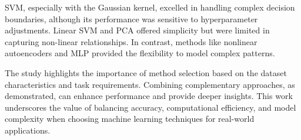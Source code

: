 \documentclass{article}
\begin{document}
SVM, especially with the Gaussian kernel, excelled in handling complex decision boundaries, although its performance was sensitive to hyperparameter adjustments. Linear SVM and PCA offered simplicity but were limited in capturing non-linear relationships. In contrast, methods like nonlinear autoencoders and MLP provided the flexibility to model complex patterns.

The study highlights the importance of method selection based on the dataset characteristics and task requirements. Combining complementary approaches, as demonstrated, can enhance performance and provide deeper insights. This work underscores the value of balancing accuracy, computational efficiency, and model complexity when choosing machine learning techniques for real-world applications.
\end{document}
